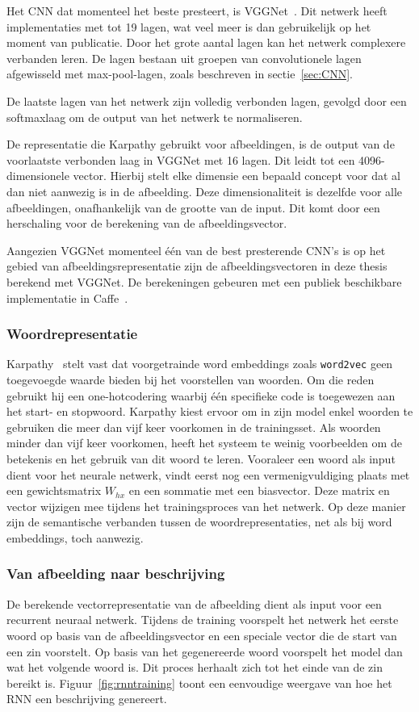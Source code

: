 Het CNN dat momenteel het beste presteert, is VGGNet~\cite{Arge2015}. Dit netwerk heeft implementaties met tot 19 lagen, wat veel meer is dan gebruikelijk op het moment van publicatie. Door het grote aantal lagen kan het netwerk complexere verbanden leren. De lagen bestaan uit groepen van convolutionele lagen afgewisseld met max-pool-lagen, zoals beschreven in sectie~\ref{sec:CNN}.

De laatste lagen van het netwerk zijn volledig verbonden lagen, gevolgd door een softmaxlaag om de output van het netwerk te normaliseren. 

De representatie die Karpathy gebruikt voor afbeeldingen, is de output van de voorlaatste verbonden laag in VGGNet met 16 lagen. Dit leidt tot een 4096-dimensionele vector. Hierbij stelt elke dimensie een bepaald concept voor dat al dan niet aanwezig is in de afbeelding. Deze dimensionaliteit is dezelfde voor alle afbeeldingen, onafhankelijk van de grootte van de input. Dit komt door een herschaling voor de berekening van de afbeeldingsvector.

Aangezien VGGNet momenteel \'e\'en van de best presterende CNN's is op het gebied van afbeeldingsrepresentatie zijn de afbeeldingsvectoren in deze thesis berekend met VGGNet. De berekeningen gebeuren met een publiek beschikbare implementatie in Caffe~\cite{Jia2014}.

\subsubsection{Woordrepresentatie}
Karpathy~\cite{Karpathy2015} stelt vast dat voorgetrainde word embeddings zoals \texttt{word2vec} geen toegevoegde waarde bieden bij het voorstellen van woorden. Om die reden gebruikt hij een one-hotcodering waarbij \'e\'en specifieke code is toegewezen aan het start- en stopwoord. Karpathy kiest ervoor om in zijn model enkel woorden te gebruiken die meer dan vijf keer voorkomen in de trainingsset. Als woorden minder dan vijf keer voorkomen, heeft het systeem te weinig voorbeelden om de betekenis en het gebruik van dit woord te leren. Vooraleer een woord als input dient voor het neurale netwerk, vindt eerst nog een vermenigvuldiging plaats met een gewichtsmatrix $W_{hx}$ en een sommatie met een biasvector. Deze matrix en vector wijzigen mee tijdens het trainingsproces van het netwerk. Op deze manier zijn de semantische verbanden tussen de woordrepresentaties, net als bij word embeddings, toch aanwezig.

\subsubsection{Van afbeelding naar beschrijving}
De berekende vectorrepresentatie van de afbeelding dient als input voor een recurrent neuraal netwerk. Tijdens de training voorspelt het netwerk het eerste woord op basis van de afbeeldingsvector en een speciale vector die de start van een zin voorstelt. Op basis van het gegenereerde woord voorspelt het model dan wat het volgende woord is. Dit proces herhaalt zich tot het einde van de zin bereikt is. Figuur~\ref{fig:rnntraining} toont een eenvoudige weergave van hoe het RNN een beschrijving genereert.

